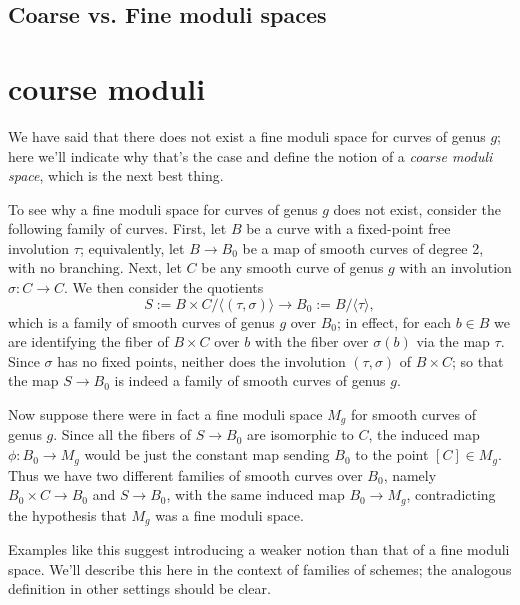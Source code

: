 \subsection{Coarse vs. Fine moduli spaces}\section{course moduli}

We have said that there does not exist a fine moduli space for curves of genus $g$; here we'll indicate why that's the case and define the notion of a \emph{coarse moduli space}, which is the next best thing.

To see why a fine moduli space for curves of genus $g$ does not exist, consider the following family of curves. First, let $B$ be a curve with a fixed-point free involution $\tau$; equivalently, let $B \to B_0$ be a map of smooth curves of degree 2, with no branching. Next, let $C$ be any smooth curve of genus $g$ with an involution $\sigma : C \to C$. We then consider the quotients $$
S := B \times C/\langle (\tau, \sigma) \rangle \to B_0 := B/\langle \tau \rangle,
$$
which is a family of smooth curves of genus $g$ over $B_0$; in effect,  for each $b \in B$ we are identifying the fiber of $B \times C$ over $b$ with the fiber over $\sigma(b)$ via the map $\tau$. Since $\sigma$ has no fixed points, neither does the involution $(\tau, \sigma)$ of $B \times C$; so that the map $S \to B_0$ is indeed a family of smooth curves of genus $g$.

Now suppose there were in fact a fine moduli space $M_g$ for smooth curves of genus $g$. Since all the fibers of $S \to B_0$ are isomorphic to $C$, the induced map $\phi : B_0 \to M_g$ would be just the constant map sending $B_0$ to the point $[C] \in M_g$. Thus we have two different families of smooth curves over $B_0$, namely $B_0 \times C \to B_0$ and $S \to B_0$, with the same induced map $B_0 \to M_g$, contradicting the hypothesis that $M_g$ was a fine moduli space.

Examples like this suggest introducing a weaker notion than that of a fine moduli space. We'll describe this here in the context of families of schemes; the analogous definition in other settings should be clear.

